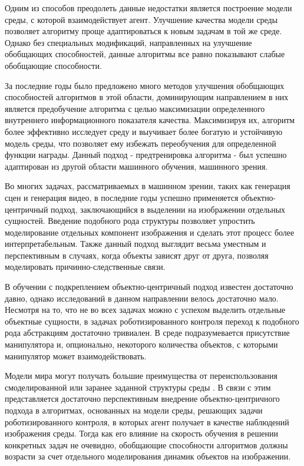 Одним из способов преодолеть данные недостатки является построение модели среды, с которой взаимодействует агент. 
Улучшение качества модели среды позволяет алгоритму проще адаптироваться к новым задачам в той же среде. 
Однако без специальных модификаций, направленных на улучшение обобщающих способностей, данные алгоритмы все равно показывают слабые обобщающие способности.

За последние годы было предложено много методов улучшения обобщающих способностей алгоритмов в этой области, доминирующим направлением в них является предобучение алгоритма с целью максимизации определенного внутреннего информационного показателя качества. 
Максимизируя их, алгоритм более эффективно исследует среду и выучивает более богатую и устойчивую модель среды, что позволяет ему избежать переобучения для определенной функции награды. 
Данный подход - предтренировка алгоритма - был успешно адаптирован из другой области машинного обучения, машинного зрения.

Во многих задачах, рассматриваемых в машинном зрении, таких как генерация сцен и генерация видео, в последние годы успешно применяется объектно-центричный подход, заключающийся в выделении на изображении отдельных сущностей. 
Введение подобного рода структуры позволяет упростить моделирование отдельных компонент изображения и сделать этот процесс более интерпретабельным. 
Также данный подход выглядит весьма уместным и перспективным в случаях, когда объекты зависят друг от друга, позволяя моделировать причинно-следственные связи.

В обучении с подкреплением объектно-центричный подход известен достаточно давно, однако исследований в данном направлении велось достаточно мало. Несмотря на то, что не во всех задачах можно с успехом выделить отдельные объектные сущности, в задачах роботизированного контроля переход к подобного рода абстракциям достаточно тривиален. 
В среде подразумевается присутствие манипулятора и, опционально, некоторого количества объектов, с которыми манипулятор может взаимодействовать.

Модели мира могут получать большие преимущества от переиспользования смоделированной или заранее заданной структуры среды \cite{WM}.
В связи с этим представляется достаточно перспективным внедрение объектно-центричного подхода в алгоритмах, основанных на модели среды, решающих задачи роботизированного контроля, в которых агент получает в качестве наблюдений изображения среды.
Тогда как его влияние на скорость обучения в решении конкретных задач не очевидно, обобщающие способности алгоритмов должны возрасти за счет отдельного моделирования динамик объектов на изображении.
